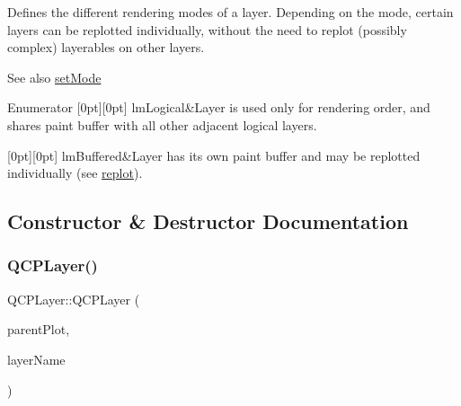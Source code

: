 Defines the different rendering modes of a layer. Depending on the mode, certain layers can be replotted individually, without the need to replot (possibly complex) layerables on other layers.

\begin{DoxySeeAlso}{See also}
\hyperlink{class_q_c_p_layer_a938d57b04f4e4c23cedf1711f983919b}{set\+Mode} 
\end{DoxySeeAlso}
\begin{DoxyEnumFields}{Enumerator}
[0pt][0pt]{}\mbox{\label{class_q_c_p_layer_a67dcfc1590be2a1f2227c5a39bb59c7ca02eb5e9a4cb7f1baf1e2b6b99e3b87ce}} 
lm\+Logical&Layer is used only for rendering order, and shares paint buffer with all other adjacent logical layers. \\
\hline

[0pt][0pt]{}\mbox{\label{class_q_c_p_layer_a67dcfc1590be2a1f2227c5a39bb59c7cab581b9fab3007c4c65f057f4185d7538}} 
lm\+Buffered&Layer has its own paint buffer and may be replotted individually (see \hyperlink{class_q_c_p_layer_adefd53b6db02f470151c416f42e37180}{replot}). \\
\hline

\end{DoxyEnumFields}


\subsection{Constructor \& Destructor Documentation}
\mbox{\label{class_q_c_p_layer_a5d0657fc86d624e5efbe930ef21af718}} 
\subsubsection{\texorpdfstring{Q\+C\+P\+Layer()}{QCPLayer()}}
{\footnotesize\ttfamily Q\+C\+P\+Layer\+::\+Q\+C\+P\+Layer (\begin{DoxyParamCaption}\item[{\hyperlink{class_q_custom_plot}{Q\+Custom\+Plot} $\ast$}]{parent\+Plot,  }\item[{const Q\+String \&}]{layer\+Name }\end{DoxyParamCaption})}

